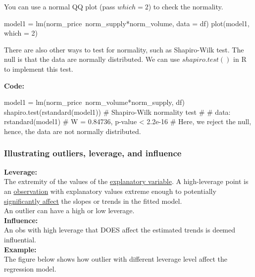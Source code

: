 \documentclass[12pt]{article}
\begin{document}
You can use a normal QQ plot (pass $ which = 2 $) to check the 
normality.

\begin{rc}
model1 = lm(norm_price~norm_supply*norm_volume, data = df)
plot(model1, which = 2)
\end{rc}




There are also other ways to test for normality, such as Shapiro-Wilk
test.
The null is that the data are normally distributed. We can use
$ shapiro.test() $ in R to implement this test.


{\textbf {Code:}}
\begin{rc}
model1 = lm(norm_price~norm_volume*norm_supply, df)
shapiro.test(rstandard(model1))
#         Shapiro-Wilk normality test
# 
# data:  rstandard(model1)
# W = 0.84736, p-value < 2.2e-16
# Here, we reject the null, hence, the data are not normally distributed. 
\end{rc}




\subsubsection{Illustrating outliers, leverage, and influence}

{\textbf {Leverage:}}\\
The extremity of the values of the {\underline {explanatory variable}}.
A high-leverage point is an {\underline {observation}} with 
explanatory values extreme enough to potentially 
{\underline {significantly affect}} the slopes or trends in the fitted
model.\\
An outlier can have a high or low leverage.\\

{\textbf {Influence:}}\\
An obs with high leverage that DOES affect the estimated trends is
deemed influential.\\

{\textbf {Example:}}\\
The figure below shows how outlier with different leverage level affect
the regression model.
\end{document}
